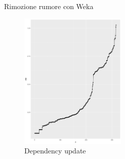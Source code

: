 \documentclass{beamer}
\begin{document}
\begin{frame}{Rimozione rumore con Weka}
  \begin{figure}[bt]
    \begin{center}
    \includegraphics[width = 0.45\textwidth]{../img/eps-minpts20.pdf}
    \caption{Dependency update}
    \end{center}
  \end{figure}
\end{frame}
\end{document}
